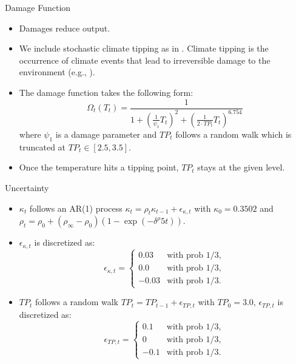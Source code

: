 \documentclass[aspectratio=169,11pt]{beamer}
\begin{document}
\begin{frame}[fragile]{Damage Function}
\begin{small}
\begin{itemize}
    \item Damages reduce output.
    \item We include stochastic climate tipping as in \cite{weitzman2012ghg,kotlikoffParetoimprovingCarbonriskTaxation2021a}. Climate tipping is the occurrence of climate events that lead to irreversible damage to the environment (e.g., \citealp{lenton2008tipping}).
    \item The damage function takes the following form:
    \begin{equation}
        \label{eq:damage_func_tipping}
    \Omega_t \left( T_{ t} \right) =  \frac{1}{1 + \left(\frac{1}{\psi_1} T_{ t} \right)^{2} + \left( \frac{1}{2 \cdot TP_{t}} T_{ t} \right)^{6.754}}
    \end{equation}
    where $\psi_1$ is a damage parameter and $TP_t$ follows a random walk which is truncated at $TP_t \in [2.5, 3.5]$.
    \item Once the temperature hits a tipping point, $TP_t$ stays at the given level.
\end{itemize}
\end{small}
\end{frame}

\begin{frame}[fragile]{Uncertainty}
\small
\begin{itemize}
    \item $\kappa_t$ follows an AR(1) process $\kappa_t = \rho_t \kappa_{t-1} + \epsilon_{\kappa,t}$ with $\kappa_0 = 0.3502$ and $\rho_t =  \rho_0 + (\rho_\infty - \rho_0) (1-\exp(- \delta^\rho  5t))$.
   \item $\epsilon_{\kappa,t}$ is discretized as:
    \begin{equation}
        \epsilon_{\kappa, t} =
\begin{cases}
0.03 & \text{with prob } 1/3, \\
0.0 & \text{with prob } 1/3, \\
- 0.03 & \text{with prob } 1/3.
\end{cases}
    \end{equation}
    \item $TP_t$ follows a random walk $TP_t = TP_{t-1} + \epsilon_{TP,t}$ with $TP_0 = 3.0$, $\epsilon_{TP,t}$ is discretized as:
    \begin{equation}
        \epsilon_{TP, t} =
\begin{cases}
0.1 & \text{with prob } 1/3, \\
0 & \text{with prob } 1/3, \\
- 0.1 & \text{with prob } 1/3.
\end{cases}
    \end{equation}
\end{itemize}
\end{frame}
\end{document}
